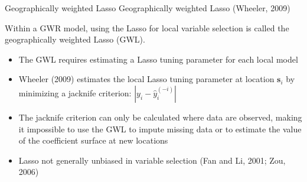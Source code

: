 \documentclass[12pt,t,handout]{beamer}
\newcommand{\subt}[1]{{\footnotesize \color{subtitle} {#1}}}
\begin{document}
\begin{frame}{Geographically weighted Lasso}
\subt{Geographically weighted Lasso (Wheeler, 2009)}

\bigskip
Within a GWR model, using the Lasso for local variable selection is called the geographically weighted Lasso (GWL).
\begin{itemize}
    \item The GWL requires estimating a Lasso tuning parameter for each local model
    \item Wheeler (2009) estimates the local Lasso tuning parameter at location $\bm{s}_i$ by minimizing a jacknife criterion: $|y_i - \hat{y}_i^{(-i)}|$
    \item The jacknife criterion can only be calculated where data are observed, making it impossible to use the GWL to impute missing data or to estimate the value of the coefficient surface at new locations
    \item Lasso not generally unbiased in variable selection (Fan and Li, 2001; Zou, 2006)
\end{itemize}

\end{frame}
\end{document}
